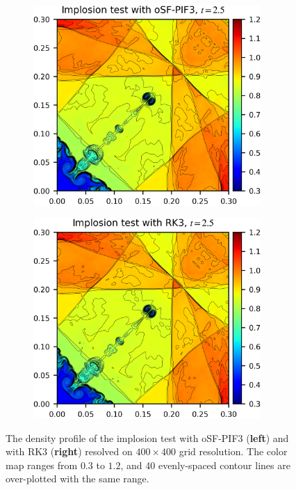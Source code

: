 \begin{figure}
    \centering
    \begin{subfigure}{70mm}
        \centering
        \includegraphics[width=0.95\textwidth]{fig/implosion_osf3.png}
    \end{subfigure}
    \begin{subfigure}{70mm}
        \centering
        \includegraphics[width=0.95\textwidth]{fig/implosion_rk3.png}
    \end{subfigure}
    \caption{The density profile of the implosion test
        with oSF-PIF3 (\textbf{left}) and with RK3 (\textbf{right})
        resolved on \( 400 \times 400 \) grid resolution.
        The color map ranges from \( 0.3 \) to \( 1.2 \), and
        40 evenly-spaced contour lines are over-plotted with
        the same range.
    }\label{fig:implosion}
\end{figure}

